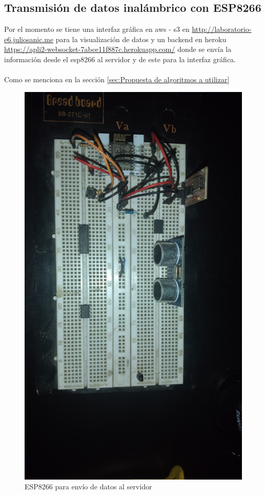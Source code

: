 \documentclass[osajnl,twocolumn,showpacs,superscriptaddress,10pt]{revtex4-1}
\begin{document}
\subsection{Transmisión de datos inalámbrico con ESP8266}
Por el momento se tiene una interfaz gráfica en aws - s3 en \url{http://laboratorio-e6.juliosanic.me} para la visualización de datos y un backend en heroku \url{https://apli2-websocket-7abce11f887c.herokuapp.com/} donde se envía la información desde el esp8266 al servidor y de este para la interfaz gráfica.
\\\\
Como se menciona en la sección \ref{sec:Propuesta de algoritmos a utilizar}


\begin{figure}[H]
    \centering
    \includegraphics[scale=0.05]{images/20231001_152253.jpg}
    \caption{ESP8266 para envío de datos al servidor}
\end{figure}
\end{document}
